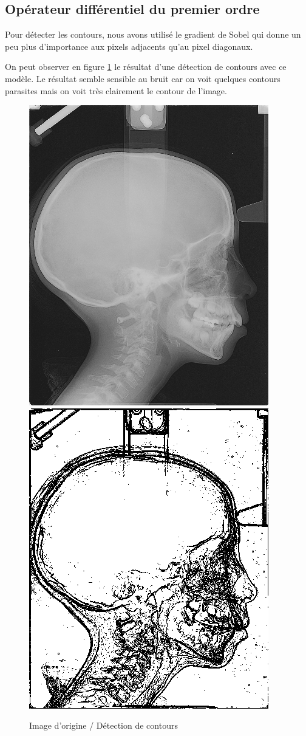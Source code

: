 \documentclass[paper=a4, fontsize=11pt]{scrartcl} %
\begin{document}
\subsection{Opérateur différentiel du premier ordre}
Pour détecter les contours, nous avons utilisé le gradient de Sobel qui donne un peu plus d'importance aux pixels adjacents qu'au pixel diagonaux.

On peut observer en figure \ref{Contour1ordre} le résultat d'une détection de contours avec ce modèle. Le résultat semble sensible au bruit car on voit quelques contours parasites mais on voit très clairement le contour de l'image.

\begin{figure} [h!]
\centering
\caption{Image d'origine / Détection de contours}
\label{Contour1ordre}
\includegraphics[scale=0.5]{images/rapport/radio1.png} 
\includegraphics[scale=0.5]{images/rapport/coucou1.png} 

\end{figure}
\end{document}
